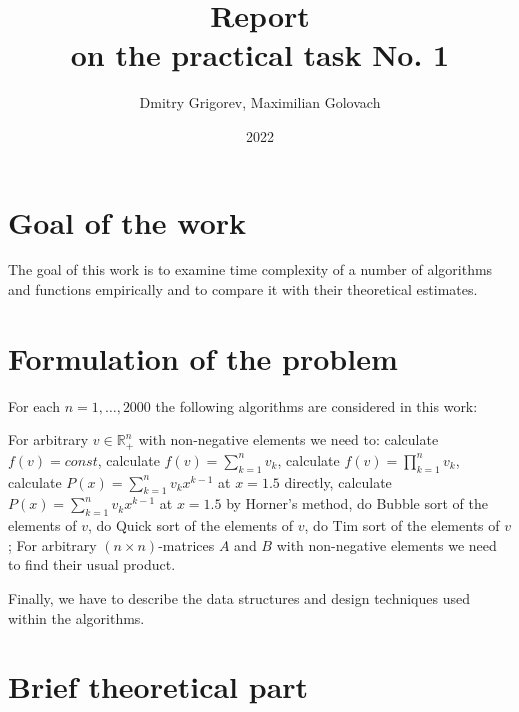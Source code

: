 \documentclass[12pt, bachelor, substylefile = algo_title.rtx]{disser}
\theoremstyle{definition}
\begin{document}
\title{Report\\
on the practical task No. 1}


\author{Dmitry Grigorev, Maximilian Golovach}
\sastatus {}

\date{2022}

\maketitle
\section{Goal of the work}
The goal of this work is to examine time complexity of a number of algorithms and functions empirically and to compare it with their theoretical estimates.

\section{Formulation of the problem}
For each $n = 1, \dots, 2000$ the following algorithms are considered in this work:
\begin{outline}
\1 For arbitrary $v \in \mathbb{R}^n_+$ with non-negative elements we need to:
\2 calculate $f(v) = const$,
\2 calculate $f(v) = \sum_{k=1}^n v_k$,
\2 calculate $f(v) = \prod_{k=1}^n v_k$,
\2 calculate $P(x) =\sum_{k=1}^n v_k x^{k-1} $ at $x = 1.5$ directly,
\2 calculate $P(x) =\sum_{k=1}^n v_k x^{k-1} $ at $x = 1.5$ by Horner's method,
\2 do Bubble sort of the elements of $v$,
\2 do Quick sort of the elements of $v$,
\2 do Tim sort of the elements of $v$;
\1 For arbitrary $(n \times n)$-matrices $A$ and $B$ with non-negative elements we need to find their usual product.
\end{outline}
Finally, we have to describe the data structures and design techniques used within the algorithms.

\section{Brief theoretical part}
\end{document}

